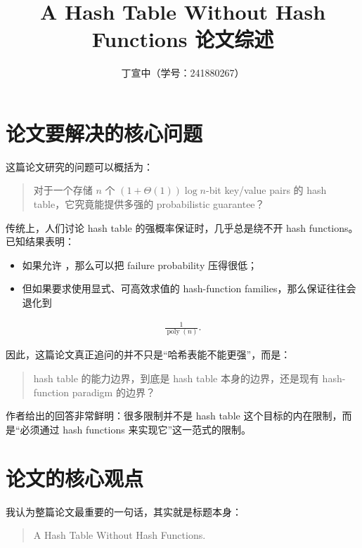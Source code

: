 \documentclass[12pt]{article}
\title{A Hash Table Without Hash Functions 论文综述}
\author{丁宣中（学号：241880267）}
\date{}
\begin{document}
\maketitle


\section{论文要解决的核心问题}

这篇论文研究的问题可以概括为：

\begin{quote}对于一个存储 \(n\) 个 \((1 + \Theta(1)) \log n\)-bit key/value pairs 的 hash table，它究竟能提供多强的 probabilistic guarantee？\cite[Abstract and Sec.~1]{kuszmaul2022}\end{quote}

传统上，人们讨论 hash table 的强概率保证时，几乎总是绕不开 hash functions。已知结果表明：

\begin{itemize}

\item 如果允许 \texttt{}，那么可以把 failure probability 压得很低；

\item 但如果要求使用显式、可高效求值的 hash-function families，那么保证往往会退化到

\end{itemize}

\[\begin{aligned}
\frac{1}{\operatorname{poly}(n)}.
\end{aligned}\]

因此，这篇论文真正追问的并不只是“哈希表能不能更强”，而是：

\begin{quote}hash table 的能力边界，到底是 hash table 本身的边界，还是现有 hash-function paradigm 的边界？\end{quote}

作者给出的回答非常鲜明：很多限制并不是 hash table 这个目标的内在限制，而是“必须通过 hash functions 来实现它”这一范式的限制\cite[Sec.~1]{kuszmaul2022}。

\section{论文的核心观点}

我认为整篇论文最重要的一句话，其实就是标题本身：

\begin{quote}A Hash Table Without Hash Functions.\end{quote}
\end{document}
